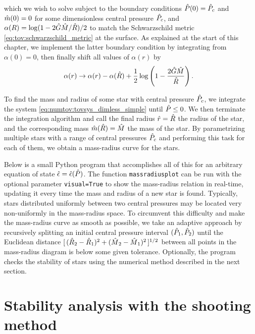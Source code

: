 which we wish to solve subject to the boundary conditions $\hat{P}(0) = \hat{P}_c$ and $\hat{m}(0) = 0$ for some dimensionless central pressure $\hat{P}_c$, and $\alpha(R) = \log ( 1 - 2 \hat{G} \hat{M} / \hat{R} ) / 2$ to match the Schwarzschild metric \eqref{eq:tov:schwarzschild_metric} at the surface.
As explained at the start of this chapter, we implement the latter boundary condition by integrating from $\alpha(0) = 0$, then finally shift all values of $\alpha(r)$ by
\begin{equation}
	\alpha(r) \rightarrow \alpha(r) - \alpha(\hat{R}) + \frac12 \log \left( 1 - \frac{2 \hat{G} \hat{M} }{ \hat{R}} \right) .
\end{equation}

To find the mass and radius of some star with central pressure $\hat{P}_c$, we integrate the system \eqref{eq:numtov:tovsys_dimless_simple} until $\hat{P} \le 0$.
We then terminate the integration algorithm and call the final radius $\hat{r} = \hat{R}$ the radius of the star, and the corresponding mass $\hat{m}(\hat{R}) = \hat{M}$ the mass of the star.
By parametrizing multiple stars with a range of central pressures $\hat{P}_c$ and performing this task for each of them, we obtain a mass-radius curve for the stars.

Below is a small Python program that accomplishes all of this for an arbitrary equation of state $\hat{\epsilon} = \hat{\epsilon}(\hat{P})$.
The function \verb|massradiusplot| can be run with the optional parameter \verb|visual=True| to show the mass-radius relation in real-time, updating it every time the mass and radius of a new star is found.
Typically, stars distributed uniformly between two central pressures may be located very non-uniformly in the mass-radius space.
To circumvent this difficulty and make the mass-radius curve as smooth as possible, we take an adaptive approach by recursively splitting an initial central pressure interval $(\hat{P}_1, \hat{P}_2)$ until the Euclidean distance $[ \, (\smash[b]{\hat{R}}_2-\smash[b]{\hat{R}}_1)^2 + (\smash[b]{\hat{M}}_2-\smash[b]{\hat{M}}_1)^2 \, ]^{1/2}$ between all points in the mass-radius diagram is below some given tolerance.
Optionally, the program checks the stability of stars using the numerical method described in the next section.


\section{Stability analysis with the shooting method}
\label{sec:numerics:shooting_method}


